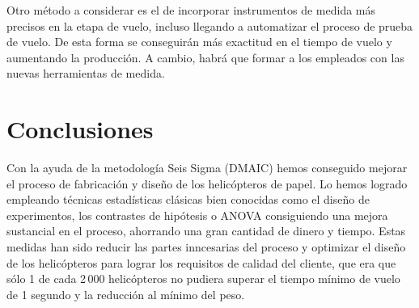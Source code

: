 \documentclass[12pt,a4paper,twoside,openright,titlepage,final]{article}
\begin{document}
Otro método a considerar es el de incorporar instrumentos de medida más precisos en la etapa de vuelo, incluso llegando a automatizar el proceso de prueba de vuelo. De esta forma se conseguirán más exactitud en el tiempo de vuelo y aumentando la producción. A cambio, habrá que formar a los empleados con las nuevas herramientas de medida.

\section{Conclusiones}

Con la ayuda de la metodología Seis Sigma (DMAIC) hemos conseguido mejorar el proceso de fabricación y diseño de los helicópteros de papel. Lo hemos logrado empleando técnicas estadísticas clásicas bien conocidas como el diseño de experimentos, los contrastes de hipótesis o ANOVA consiguiendo una mejora sustancial en el proceso, ahorrando una gran cantidad de dinero y tiempo. Estas medidas han sido reducir las partes inncesarias del proceso y optimizar el diseño de los helicópteros para lograr los requisitos de calidad del cliente, que era que sólo 1 de cada 2\,000 helicópteros no pudiera superar el tiempo mínimo de vuelo de 1 segundo y la reducción al mínimo del peso. 



\end{document}
